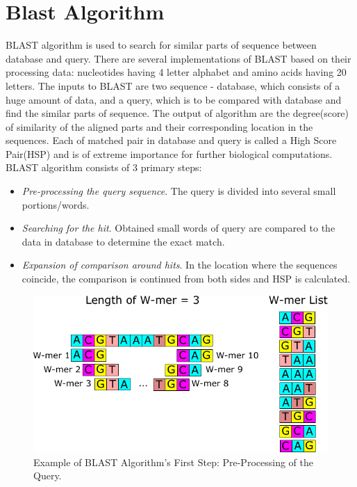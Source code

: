 \section{Blast Algorithm}
\label{sec:blast}

\quad BLAST algorithm is used to search for similar parts of sequence between database and query. There are several implementations of BLAST based on their processing data: nucleotides having 4 letter alphabet and amino acids having 20 letters. The inputs to BLAST are two sequence - database, which consists of a huge amount of data, and a query, which is to be compared with database and find the similar parts of sequence. The output of algorithm are the degree(score) of similarity of the aligned parts and their corresponding location in the sequences. Each of matched pair in database and query is called a High Score Pair(HSP) and is of extreme importance for further biological computations. BLAST algorithm consists of 3 primary steps:
\begin{itemize}
\item{\textit{Pre-processing the query sequence}. The query is divided into several small portions/words.} 
\item{\textit{Searching for the hit}. Obtained small words of query are compared to the data in database to determine the exact match.}
\item{\textit{Expansion of comparison around hits}. In the location where the sequences coincide, the comparison is continued from both sides and HSP is calculated.}
\end{itemize}

\begin{figure}[t!]
\centering
\includegraphics[width=\columnwidth]{Figures/Algorithm1.pdf}
\caption{Example of BLAST Algorithm's First Step: Pre-Processing of the Query.} \label{fig:step1}
\end{figure}


